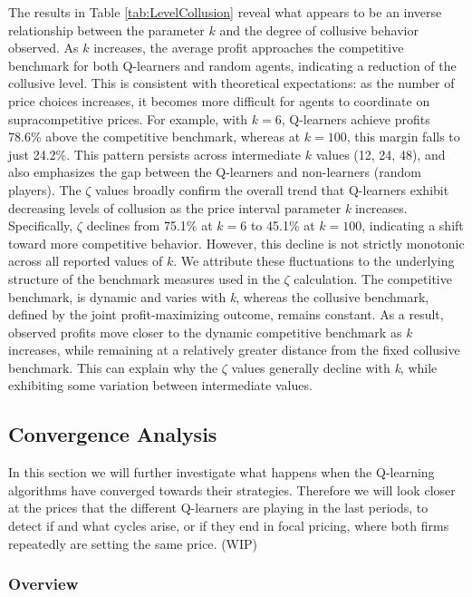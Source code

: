 \documentclass{article}
\begin{document}
The results in Table \ref{tab:LevelCollusion} reveal what appears to be an inverse relationship between the parameter $k$ and the degree of collusive behavior observed. As $k$ increases, the average profit approaches the competitive benchmark for both Q-learners and random agents, indicating a reduction of the collusive level. This is consistent with theoretical expectations: as the number of price choices increases, it becomes more difficult for agents to coordinate on supracompetitive prices. For example, with $k = 6$, Q-learners achieve profits 78.6\% above the competitive benchmark, whereas at $k = 100$, this margin falls to just 24.2\%. This pattern persists across intermediate $k$ values (12, 24, 48), and also emphasizes the gap between the Q-learners and non-learners (random players).
\newline
The $\zeta$ values broadly confirm the overall trend that Q-learners exhibit decreasing levels of collusion as the price interval parameter \textit{k} increases. Specifically, $\zeta$ declines from 75.1\% at $k= 6$ to 45.1\% at $k=100$, indicating a shift toward more competitive behavior. However, this decline is not strictly monotonic across all reported values of $k$. We attribute these fluctuations to the underlying structure of the benchmark measures used in the $\zeta$ calculation. The competitive benchmark, is dynamic and varies with \textit{k}, whereas the collusive benchmark, defined by the joint profit-maximizing outcome, remains constant. As a result, observed profits move closer to the dynamic competitive benchmark as \textit{k} increases, while remaining at a relatively greater distance from the fixed collusive benchmark.
This can explain why the $\zeta$ values generally decline with \textit{k}, while exhibiting some variation between intermediate values.

\subsection{Convergence Analysis}
\label{Convergence Analysis}
In this section we will further investigate what happens when the Q-learning algorithms have converged towards their strategies. Therefore we will look closer at the prices that the different Q-learners are playing in the last periods, to detect if and what cycles arise, or if they end in focal pricing, where both firms repeatedly are setting the same price. (WIP)

\subsubsection{Overview}
\end{document}
